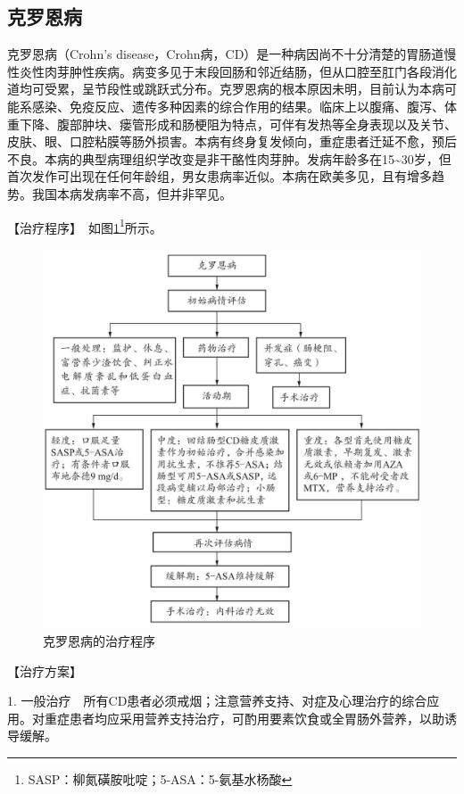 \subsection{克罗恩病}

克罗恩病（Crohn's
disease，Crohn病，CD）是一种病因尚不十分清楚的胃肠道慢性炎性肉芽肿性疾病。病变多见于末段回肠和邻近结肠，但从口腔至肛门各段消化道均可受累，呈节段性或跳跃式分布。克罗恩病的根本原因未明，目前认为本病可能系感染、免疫反应、遗传多种因素的综合作用的结果。临床上以腹痛、腹泻、体重下降、腹部肿块、瘘管形成和肠梗阻为特点，可伴有发热等全身表现以及关节、皮肤、眼、口腔粘膜等肠外损害。本病有终身复发倾向，重症患者迁延不愈，预后不良。本病的典型病理组织学改变是非干酪性肉芽肿。发病年龄多在15\textasciitilde{}30岁，但首次发作可出现在任何年龄组，男女患病率近似。本病在欧美多见，且有增多趋势。我国本病发病率不高，但并非罕见。

【治疗程序】　如图\ref{fig3-6-2}\footnote{SASP：柳氮磺胺吡啶；5-ASA：5-氨基水杨酸}所示。

\begin{figure}[!htbp]
 \centering
 \includegraphics{./images/Image00093.jpg}
 \captionsetup{justification=centering}
 \caption{克罗恩病的治疗程序}
 \label{fig3-6-2}
  \end{figure} 

【治疗方案】

1.
一般治疗　所有CD患者必须戒烟；注意营养支持、对症及心理治疗的综合应用。对重症患者均应采用营养支持治疗，可酌用要素饮食或全胃肠外营养，以助诱导缓解。

